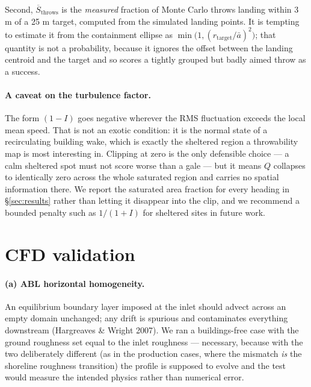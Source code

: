 \documentclass[11pt,letterpaper]{article}
\begin{document}
Second, $\overline{S}_{\text{throws}}$ is the \emph{measured} fraction of Monte
Carlo throws landing within 3 m of a 25 m target, computed from the simulated
landing points. It is tempting to estimate it from the containment ellipse as
$\min\!\big(1, (r_{\text{target}}/\bar a)^2\big)$; that quantity is not a
probability, because it ignores the offset between the landing centroid and the
target and so scores a tightly grouped but badly aimed throw as a success.

\paragraph{A caveat on the turbulence factor.} The form $(1 - I)$ goes negative
wherever the RMS fluctuation exceeds the local mean speed. That is not an exotic
condition: it is the normal state of a recirculating building wake, which is
exactly the sheltered region a throwability map is most interesting in.
Clipping at zero is the only defensible choice --- a calm sheltered spot must
not score worse than a gale --- but it means $Q$ collapses to identically zero
across the whole saturated region and carries no spatial information there. We
report the saturated area fraction for every heading in \S\ref{sec:results}
rather than letting it disappear into the clip, and we recommend a bounded
penalty such as $1/(1+I)$ for sheltered sites in future work.

\section{CFD validation}
\label{sec:cfdvalid}

\paragraph{(a) ABL horizontal homogeneity.} An equilibrium boundary layer
imposed at the inlet should advect across an empty domain unchanged; any drift
is spurious and contaminates everything downstream (Hargreaves \& Wright 2007).
We ran a buildings-free case with the ground roughness set equal to the inlet
roughness --- necessary, because with the two deliberately different (as in the
production cases, where the mismatch \emph{is} the shoreline roughness
transition) the profile is supposed to evolve and the test would measure the
intended physics rather than numerical error.
\end{document}
